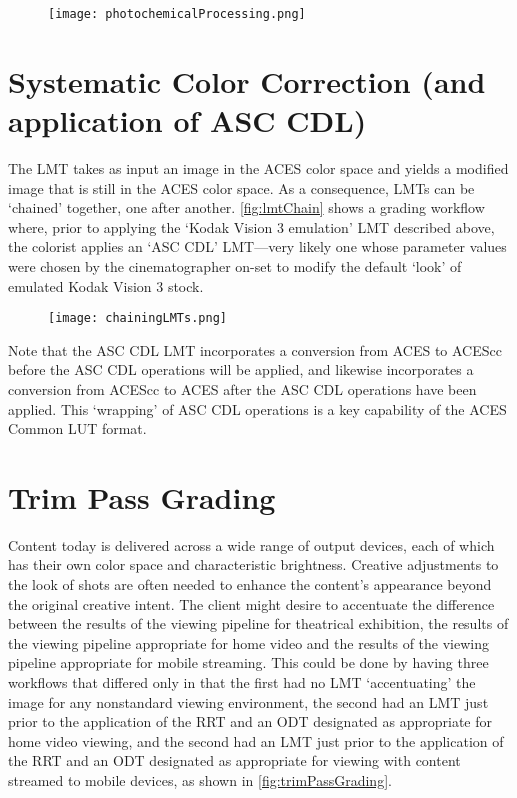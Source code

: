 \begin{figure}[H]
\begin{center}
    \texttt{[image: photochemicalProcessing.png]}
\caption{}
\label{fig:photochemical}
\end{center}
\end{figure}

\section{Systematic Color Correction (and application of ASC CDL)}
The LMT takes as input an image in the ACES color space and yields a modified image that is still in the ACES color space. As a consequence, LMTs can be `chained' together, one after another. \autoref{fig:lmtChain} shows a grading workflow where, prior to applying the `Kodak Vision 3 emulation' LMT described above, the colorist applies an `ASC CDL' LMT—very likely one whose parameter values were chosen by the cinematographer on-set to modify the default `look' of emulated Kodak Vision 3 stock. 

\begin{figure}[H]
\begin{center}
    \texttt{[image: chainingLMTs.png]}
\caption{}
\label{fig:lmtChain}
\end{center}
\end{figure}

 
Note that the ASC CDL LMT incorporates a conversion from ACES to ACEScc before the ASC CDL operations will be applied, and likewise incorporates a conversion from ACEScc to ACES after the ASC CDL operations have been applied. This `wrapping' of ASC CDL operations is a key capability of the ACES Common LUT format.

\section{Trim Pass Grading}
Content today is delivered across a wide range of output devices, each of which has their own color space and characteristic brightness. Creative adjustments to the look of shots are often needed to enhance the content's appearance beyond the original creative intent. The client might desire to accentuate the difference between the results of the viewing pipeline for theatrical exhibition, the results of the viewing pipeline appropriate for home video and the results of the viewing pipeline appropriate for mobile streaming. This could be done by having three workflows that differed only in that the first had no LMT `accentuating' the image for any nonstandard viewing environment, the second had an LMT just prior to the application of the RRT and an ODT designated as appropriate for home video viewing, and the second had an LMT just prior to the application of the RRT and an ODT designated as appropriate for viewing with content streamed to mobile devices, as shown in \autoref{fig:trimPassGrading}.

